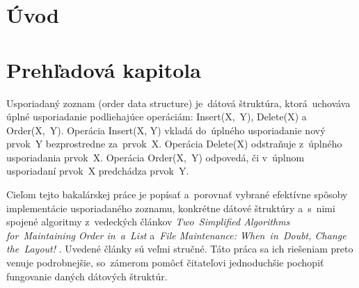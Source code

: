 \documentclass[
  digital,     %
  oneside,     %
  nosansbold,  %
  nocolorbold, %
  lof,         %
  lot,         %
]{fithesis4}
\begin{document}

\chapter*{Úvod}

\chapter{Prehľadová kapitola}
Usporiadaný zoznam (order data structure) \cite{paper1_ordered_list}  je~dátová štruktúra, ktorá~uchováva úplné usporiadanie podliehajúce operáciám: Insert(X,~Y), Delete(X) a Order(X,~Y). Operácia Insert(X, Y) vkladá do~úplného usporiadanie nový prvok~Y bezprostredne za~prvok~X. Operácia Delete(X) odstraňuje z~úplného usporiadania prvok~X. Operácia Order(X,~Y) odpovedá, či v~úplnom usporiadaní prvok~X predchádza prvok~Y.

Cieľom tejto bakalárskej práce je popísať a~porovnať vybrané efektívne spôsoby implementácie usporiadaného zoznamu, konkrétne dátové štruktúry a~s~nimi spojené algoritmy z~vedeckých článkov \textit{Two~Simplified Algorithms for~Maintaining Order in~a~List} \cite{paper1_ordered_list} a~\textit{File Maintenance: When~in~Doubt, Change the~Layout!} \cite{paper2_file_maintenance}. Uvedené články sú veľmi stručné. Táto práca sa ich riešeniam preto venuje podrobnejšie, so~zámerom pomôcť čitateľovi jednoduchšie pochopiť fungovanie daných dátových štruktúr.
\end{document}
